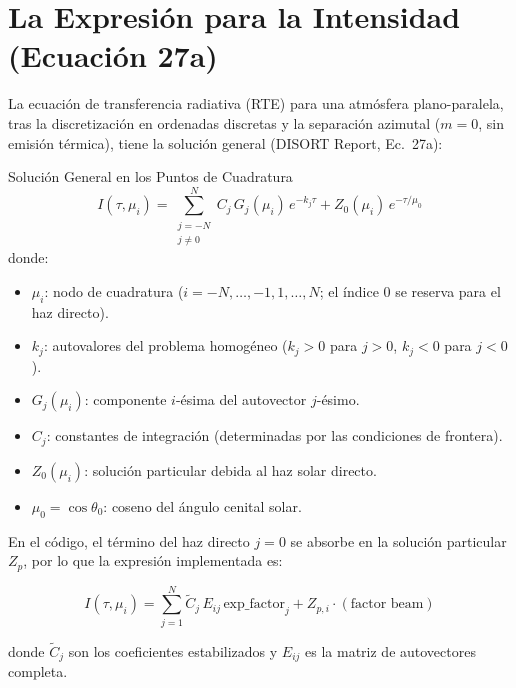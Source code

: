 \documentclass[a4paper,11pt]{article}
\begin{document}
\section{La Expresi\'on para la Intensidad (Ecuaci\'on 27a)}
\label{sec:intensity_expr}

La ecuaci\'on de transferencia radiativa (RTE) para una atm\'osfera plano-paralela, tras la discretizaci\'on en ordenadas discretas y la separaci\'on azimutal ($m=0$, sin emisi\'on t\'ermica), tiene la soluci\'on general (DISORT Report, Ec.\ 27a):

\begin{keyresult}{Soluci\'on General en los Puntos de Cuadratura}
\begin{equation}
\boxed{
I(\tau, \mu_i) = \sum_{\substack{j=-N \\ j \neq 0}}^{N} C_j \, G_j(\mu_i) \, e^{-k_j \tau} + Z_0(\mu_i) \, e^{-\tau/\mu_0}
}
\label{eq:27a}
\end{equation}
donde:
\begin{itemize}
\item $\mu_i$: nodo de cuadratura ($i = -N, \ldots, -1, 1, \ldots, N$; el \'indice 0 se reserva para el haz directo).
\item $k_j$: autovalores del problema homog\'eneo ($k_j > 0$ para $j > 0$, $k_j < 0$ para $j < 0$).
\item $G_j(\mu_i)$: componente $i$-\'esima del autovector $j$-\'esimo.
\item $C_j$: constantes de integraci\'on (determinadas por las condiciones de frontera).
\item $Z_0(\mu_i)$: soluci\'on particular debida al haz solar directo.
\item $\mu_0 = \cos\theta_0$: coseno del \'angulo cenital solar.
\end{itemize}
\end{keyresult}

En el c\'odigo, el t\'ermino del haz directo $j=0$ se absorbe en la soluci\'on particular $Z_p$, por lo que la expresi\'on implementada es:

\begin{equation}
I(\tau, \mu_i) = \sum_{j=1}^{N} \widetilde{C}_j \, E_{ij} \, \text{exp\_factor}_j + Z_{p,i} \cdot (\text{factor beam})
\label{eq:code_intensity}
\end{equation}

donde $\widetilde{C}_j$ son los coeficientes estabilizados y $E_{ij}$ es la matriz de autovectores completa.
\end{document}
